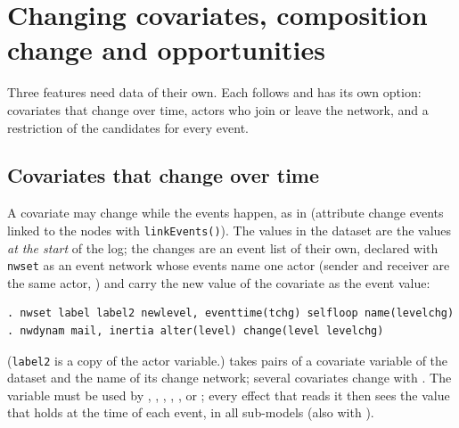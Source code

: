 \chapter{Changing covariates, composition change and opportunities}\label{ch:special}

Three features need data of their own. Each follows \goldfish{} and has its own option: covariates that change over time, actors who join or leave the network, and a restriction of the candidates for every event.

\section{Covariates that change over time}\label{sec:tvc}

A covariate may change while the events happen, as in \goldfish{} (attribute change events linked to the nodes with \texttt{linkEvents()}). The values in the dataset are the values \emph{at the start} of the log; the changes are an event list of their own, declared with \texttt{nwset} as an event network whose events name one actor (sender and receiver are the same actor, ) and carry the new value of the covariate as the event value:
\begin{lstlisting}
. nwset label label2 newlevel, eventtime(tchg) selfloop name(levelchg)
. nwdynam mail, inertia alter(level) change(level levelchg)
\end{lstlisting}
(\texttt{label2} is a copy of the actor variable.)  takes pairs of a covariate variable of the dataset and the name of its change network; several covariates change with . The variable must be used by , , , , ,  or ; every effect that reads it then sees the value that holds at the time of each event, in all sub-models (also with ).
